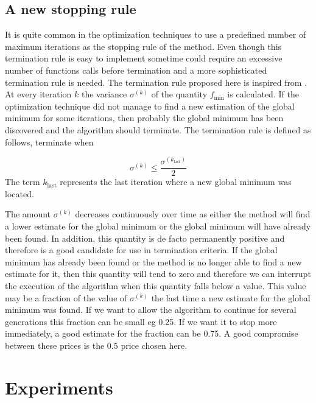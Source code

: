 \documentclass[symmetry,article,submit,moreauthors,pdftex]{Definitions/mdpi}
\begin{document}
\subsection{A new stopping rule \label{subsec:A-new-stopping}}

It is quite common in the optimization techniques to use a predefined
number of maximum iterations as the stopping rule of the method. Even
though this termination rule is easy to implement sometime could require
an excessive number of functions calls before termination and a more
sophisticated termination rule is needed.\textbf{ }The termination
rule proposed here is inspired from \cite{psotsoulos}. At every iteration
$k$ the variance\textbf{ $\sigma^{(k)}$ }of the quantity $f_{\mbox{min}}$
is calculated. If the optimization technique did not manage to find
a new estimation of the global minimum for some iterations, then probably the global minimum has been discovered and
 the algorithm should terminate. The termination rule
is defined as follows, terminate when 

\textbf{
\begin{equation}
\sigma^{(k)}\le\frac{\sigma^{\left(k_{\mbox{last}}\right)}}{2}\label{eq:termination_mine}
\end{equation}
}The term\textbf{ $k_{\mbox{last}}$ }represents the last iteration
where a new global minimum was located. 


The amount $\sigma^{(k)}$ decreases continuously over time as either the method will find a lower estimate for the global minimum or the global minimum will have already been found. In addition, this quantity is de facto permanently positive and therefore is a good candidate  for use in termination criteria. If the global minimum has already been found or the method is no longer able to find a new estimate for it, then this quantity will tend to zero and therefore we can interrupt the execution of the algorithm when this quantity falls below a value. This value may be a fraction of the value of $\sigma^{(k)}$ the last time a new estimate for the global minimum was found. If we want to allow the algorithm to continue for several generations this fraction can be small eg 0.25. If we want it to stop more immediately, a good estimate for the fraction can be 0.75. A good compromise between these prices is the 0.5 price chosen here. 

\section{Experiments \label{sec:Experiments}}
\end{document}
